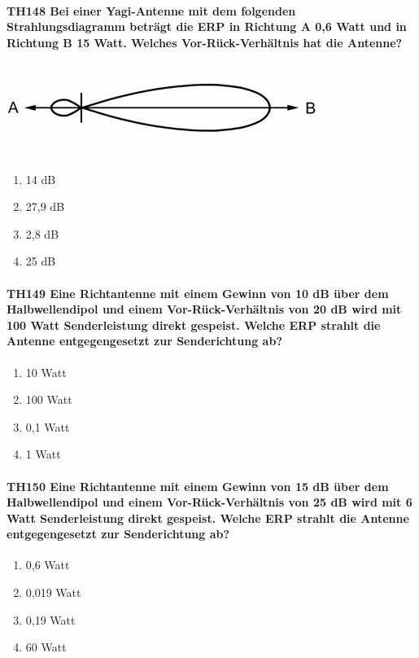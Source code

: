 \documentclass[8pt]{article}
\begin{document}
\paragraph*{TH148 Bei einer Yagi-Antenne mit dem folgenden Strahlungsdiagramm beträgt die ERP in Richtung A 0,6 Watt und in Richtung B 15 Watt. Welches Vor-Rück-Verhältnis hat die Antenne?}
\begin{center}
	\begin{minipage}{\linewidth}
		\centering
		\includegraphics[scale=1.0]{pics/th148_a.jpg}
	\end{minipage}
\end{center}
\begin{enumerate}[nolistsep,label=\Alph*]
\item 14 dB
\item 27,9 dB
\item 2,8 dB
\item 25 dB
\end{enumerate}

\paragraph*{TH149 Eine Richtantenne mit einem Gewinn von 10 dB über dem Halbwellendipol und einem Vor-Rück-Verhältnis von 20 dB wird mit 100 Watt Senderleistung direkt gespeist. Welche ERP strahlt die Antenne entgegengesetzt zur Senderichtung ab?}
\begin{enumerate}[nolistsep,label=\Alph*]
\item 10 Watt
\item 100 Watt
\item 0,1 Watt
\item 1 Watt
\end{enumerate}

\paragraph*{TH150 Eine Richtantenne mit einem Gewinn von 15 dB über dem Halbwellendipol und einem Vor-Rück-Verhältnis von 25 dB wird mit 6 Watt Senderleistung direkt gespeist. Welche ERP strahlt die Antenne entgegengesetzt zur Senderichtung ab?}
\begin{enumerate}[nolistsep,label=\Alph*]
\item 0,6 Watt
\item 0,019 Watt
\item 0,19 Watt
\item 60 Watt
\end{enumerate}
\end{document}
